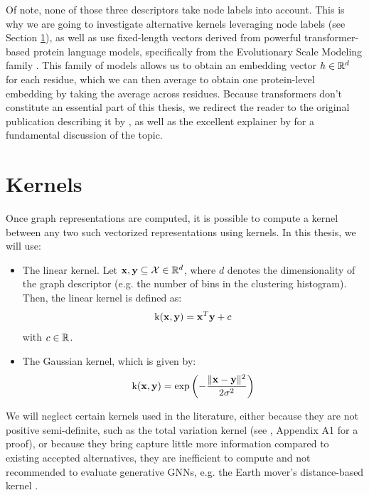 Of note, none of those three descriptors take node labels into account. This is
why we are going to investigate alternative kernels leveraging node labels (see
Section \ref{sec:kernels}), as well as use fixed-length vectors derived from
powerful transformer-based protein language models, specifically from the
Evolutionary Scale Modeling family \citep{rives10biological}. This family of
models allows us to obtain an embedding vector $h\in\mathbb{R}^d$ for each residue,
which we can then average to obtain one protein-level embedding by taking the
average across residues. Because transformers don't constitute an essential part
of this thesis, we redirect the reader to the original publication describing it
by \cite{vaswani2017attention}, as well as the excellent explainer by
\cite{alammar2018} for a fundamental discussion of the topic.

\section{Kernels}\label{sec:kernels}

Once graph representations are computed, it is possible to compute a kernel
between any two such vectorized representations using kernels. In this thesis,
we will use:

\begin{itemize}
\item The linear kernel. Let $\mathbf{x},\mathbf{y}\subseteq \mathcal{X}\in\mathbb{R}^d$, where $d$
  denotes the dimensionality of the graph descriptor (e.g. the number of bins in
  the clustering histogram). Then, the linear kernel is defined as:
  \begin{equation}
    \label{eq:linear_kernel}
    \text{k}(\mathbf{x}, \mathbf{y}) = \mathbf{x}^T \mathbf{y} + c
  \end{equation}
  with $c\in\mathbb{R}$.
\item The Gaussian kernel, which is given by:
  \begin{equation}
    \label{eq:gaussian_kernel}
    \text{k}(\mathbf{x}, \mathbf{y}) = \exp\left( -{\lVert \mathbf{x}-\mathbf{y} \rVert^2\over 2\sigma^2} \right)
  \end{equation}
\end{itemize}

We will neglect certain kernels used in the literature, either because they are not
positive semi-definite, such as the total variation kernel (see
\cite{o2021evaluation}, Appendix A1 for a proof), or because they bring capture
little more information compared to existing accepted alternatives, they are
inefficient to compute and not recommended to evaluate generative GNNs, e.g. the
Earth mover's distance-based kernel \citep{o2021evaluation}.

